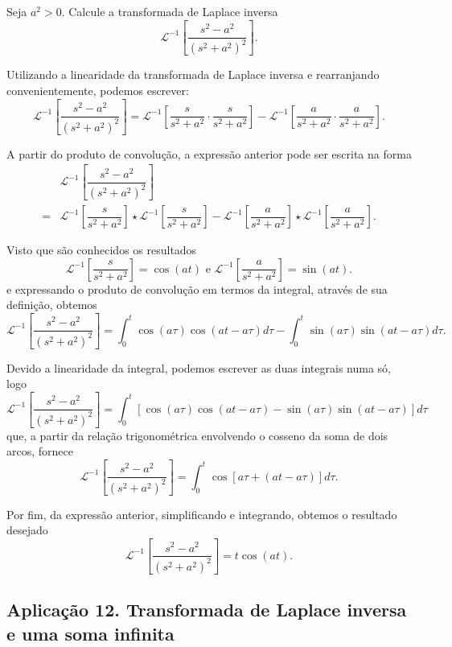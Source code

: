 Seja $a^{2} > 0$. Calcule a transformada de Laplace inversa
$$\mathscr{L}^{-1}
\left[
\dfrac{s^{2} - a^{2}}{(s^{2} + a^{2})^{2}}
\right].$$

Utilizando a linearidade da transformada de Laplace inversa e rearranjando convenientemente, podemos escrever:
$$\mathscr{L}^{-1}
\left[
\dfrac{s^{2} - a^{2}}{(s^{2} + a^{2})^{2}}
\right]
=
\mathscr{L}^{-1}
\left[
\dfrac{s}{s^{2} + a^{2}}
\cdot
\dfrac{s}{s^{2} + a^{2}}
\right]
- \mathscr{L}^{-1}
\left[
\dfrac{a}{s^{2} + a^{2}}
\cdot
\dfrac{a}{s^{2} + a^{2}}
\right].$$

A partir do produto de convolução, a expressão anterior pode ser escrita na forma
$$\begin{array}{rl}
&\mathscr{L}^{-1}
\left[
\dfrac{s^{2} - a^{2}}{(s^{2} + a^{2})^{2}}
\right] \\[0.5cm]
=& \mathscr{L}^{-1}
\left[
\dfrac{s}{s^{2} + a^{2}}
\right]
\star
\mathscr{L}^{-1}
\left[
\dfrac{s}{s^{2} + a^{2}}
\right]
- \mathscr{L}^{-1}
\left[
\dfrac{a}{s^{2} + a^{2}}
\right]
\star
\mathscr{L}^{-1}
\left[
\dfrac{a}{s^{2} + a^{2}}
\right].
\end{array}$$

Visto que são conhecidos os resultados
$$\mathscr{L}^{-1}
\left[
\dfrac{s}{s^{2} + a^{2}}
\right]
= \cos(at) \mbox{ e } \mathscr{L}^{-1}
\left[
\dfrac{a}{s^{2} + a^{2}}
\right]
= \sin(at).$$
e expressando o produto de convolução em termos da integral, através de sua definição, obtemos
$$\mathscr{L}^{-1}
\left[
\dfrac{s^{2} - a^{2}}{(s^{2} + a^{2})^{2}}
\right]
=
\int_{0}^{t}
\cos(a\tau) \cos(at - a\tau) d\tau -
\int_{0}^{t}
\sin(a\tau) \sin(at - a\tau) d\tau.
$$

Devido a linearidade da integral, podemos escrever as duas integrais numa só, logo
$$\mathscr{L}^{-1}
\left[
\dfrac{s^{2} - a^{2}}{(s^{2} + a^{2})^{2}}
\right]
=
\int_{0}^{t}
[\cos(a\tau) \cos(at - a\tau) - \sin(a\tau) \sin(at - a\tau)] d\tau$$
que, a partir da relação trigonométrica envolvendo o cosseno da soma de dois arcos, fornece
$$\mathscr{L}^{-1}
\left[
\dfrac{s^{2} - a^{2}}{(s^{2} + a^{2})^{2}}
\right]
=
\int_{0}^{t}
\cos[a\tau + (at - a\tau)] d\tau.$$

Por fim, da expressão anterior, simplificando e integrando, obtemos o resultado desejado
$$\mathscr{L}^{-1}
\left[
\dfrac{s^{2} - a^{2}}{(s^{2} + a^{2})^{2}}
\right]
= t \cos(at).$$

\subsection{Aplicação 12. Transformada de Laplace inversa e uma soma infinita}


